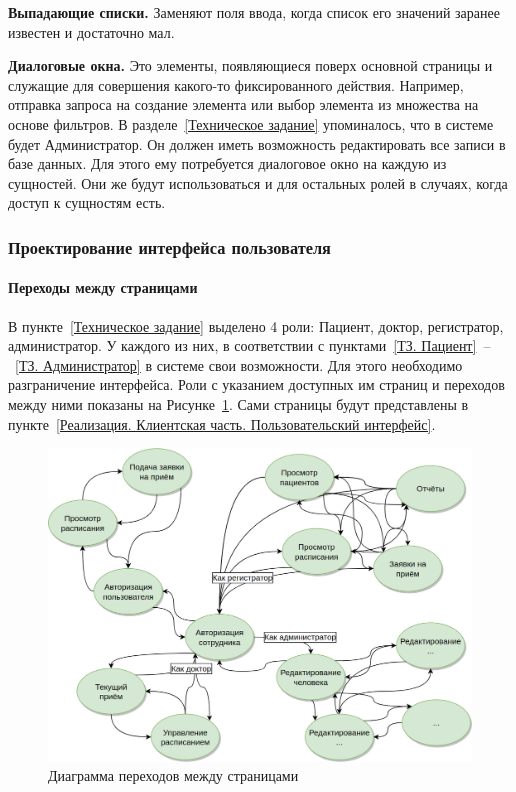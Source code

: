 \documentclass[a4paper,article]{article}
\begin{document}
\begin{sloppypar}
    \textbf{Выпадающие списки.} Заменяют поля ввода, когда список его значений заранее известен и достаточно мал.

    \textbf{Диалоговые окна.} Это элементы, появляющиеся поверх основной страницы и служащие для совершения какого-то фиксированного действия. Например, отправка запроса на создание элемента или выбор элемента из множества на основе фильтров. В разделе~\ref{Техническое задание} упоминалось, что в системе будет Администратор. Он должен иметь возможность редактировать все записи в базе данных. Для этого ему потребуется диалоговое окно на каждую из сущностей. Они же будут использоваться и для остальных ролей в случаях, когда доступ к сущностям есть.

    \subsubsection{Проектирование интерфейса пользователя}
    
    \paragraph{Переходы между страницами}

    В пункте~\ref{Техническое задание} выделено 4 роли: Пациент, доктор, регистратор, администратор. У каждого из них, в соответствии с пунктами~\ref{ТЗ. Пациент}~--~\ref{ТЗ. Администратор} в системе свои возможности. Для этого необходимо разграничение интерфейса. Роли с указанием доступных им страниц и переходов между ними показаны на Рисунке~\ref{fig:Диаграмма переходов между страницами}. Сами страницы будут представлены в пункте~\ref{Реализация. Клиентская часть. Пользовательский интерфейс}.
    
    \begin{figure}[h]
        \centering
        \includegraphics[width=0.9\linewidth]{Диаграмма переходов между страницами.png}
        \caption{\centering Диаграмма переходов между страницами}
        \label{fig:Диаграмма переходов между страницами}
    \end{figure}
    

\end{sloppypar}
\end{document}
